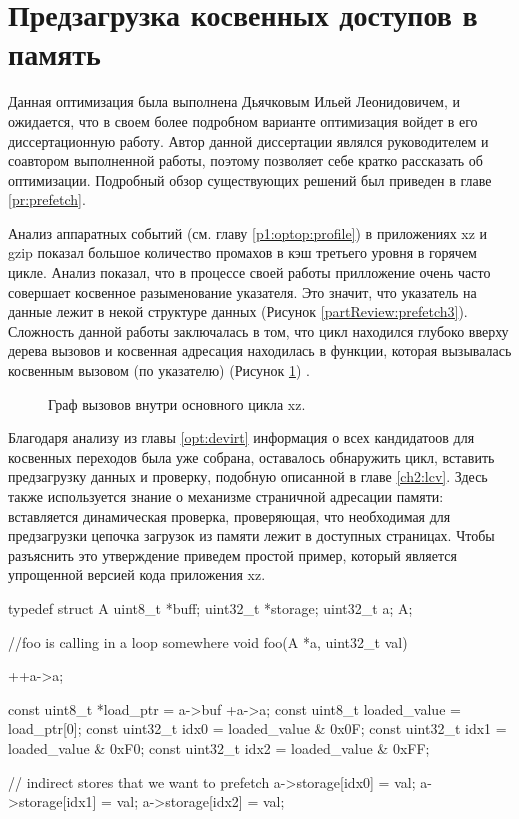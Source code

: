 \section{Предзагрузка косвенных доступов в память} \label{opt:prefetch}
Данная оптимизация была выполнена Дьячковым Ильей Леонидовичем, и ожидается, что в своем более подробном варианте оптимизация войдет в его диссертационную работу.  Автор данной диссертации являлся руководителем и соавтором выполненной работы, поэтому позволяет себе кратко рассказать  об оптимизации.  Подробный обзор существующих решений был приведен в главе \ref{pr:prefetch}. 

Анализ аппаратных событий (см. главу \ref{p1:optop:profile}) в приложениях xz и gzip показал большое количество промахов в кэш третьего уровня в горячем цикле. Анализ показал, что в процессе своей работы прилложение очень часто совершает косвенное разыменование указателя. Это значит, что указатель на данные лежит в некой структуре данных (Рисунок \ref{partReview:prefetch3}). Сложность данной работы заключалась в том, что цикл находился глубоко вверху дерева вызовов и косвенная адресация находилась в функции, которая вызывалась косвенным вызовом (по указателю) (Рисунок \ref{optpref1}) \cite{E240105}. 
\begin{figure}[htbp]
	\centering
	
	\caption{Граф вызовов внутри основного цикла xz.}
	\label{optpref1}
\end{figure}
Благодаря анализу из главы \ref{opt:devirt} информация о всех кандидатоов для косвенных переходов была уже собрана, оставалось обнаружить цикл, вставить предзагрузку данных и проверку, подобную описанной в главе \ref{ch2:lcv}. Здесь также используется знание о механизме страничной адресации памяти: вставляется динамическая проверка, проверяющая, что необходимая для предзагрузки цепочка загрузок из памяти лежит в доступных страницах. Чтобы разъяснить это утверждение приведем простой пример, который является упрощенной версией кода приложения xz.

  \begin{ListingEnv}[!h]
 	\captiondelim{ } %
 	\caption{Образец кода для анализа косвенной предзагрузки данных.}\label{ind_pref1}
 	
 	\begin{Verb}
 	typedef struct A
 	{
 		uint8_t *buff;
 		uint32_t *storage;
 		uint32_t a;
 	} A;
 	
 	//foo is calling in a loop somewhere
 	void foo(A *a, uint32_t val)
 	{
 		++a->a;
 		
 		const uint8_t *load_ptr = a->buf +a->a;
 		const uint8_t loaded_value  = load_ptr[0];
 		const uint32_t idx0 = loaded_value & 0x0F;
 		const uint32_t idx1 = loaded_value & 0xF0;
 		const uint32_t idx2 = loaded_value & 0xFF;
 		
 		// indirect stores that we want to prefetch
 		a->storage[idx0] = val;
 		a->storage[idx1] = val;
 		a->storage[idx2] = val;
 	}
 	\end{Verb}
 \end{ListingEnv}
 
